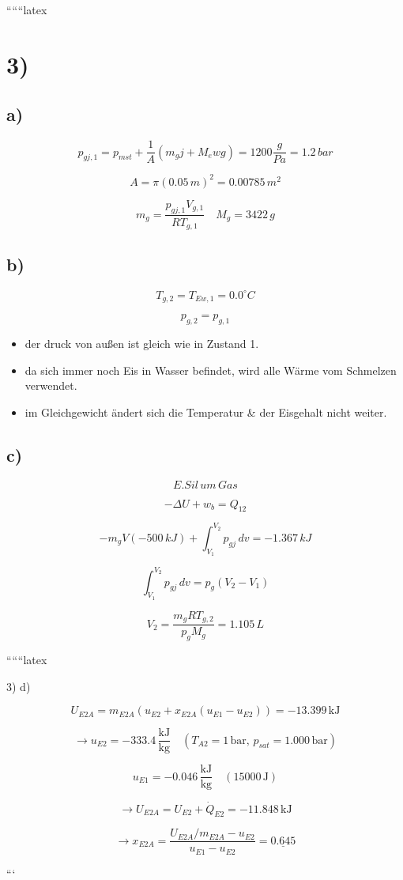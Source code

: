 
``````latex


\section*{3)}

\subsection*{a)}

\[
p_{gj,1} = p_{mst} + \frac{1}{A} (m_g j + M_e w g) = 1200 \frac{g}{Pa} = 1.2 \, bar
\]

\[
A = \pi (0.05 \, m)^2 = 0.00785 \, m^2
\]

\[
m_g = \frac{p_{gj,1} V_{g,1}}{R T_{g,1}} \quad M_g = 3422 \, g
\]

\subsection*{b)}

\[
T_{g,2} = T_{Ew,1} = 0.0^\circ C
\]

\[
p_{g,2} = p_{g,1}
\]

\begin{itemize}
    \item der druck von außen ist gleich wie in Zustand 1.
    \item da sich immer noch Eis in Wasser befindet, wird alle Wärme vom Schmelzen verwendet.
    \item im Gleichgewicht ändert sich die Temperatur \& der Eisgehalt nicht weiter.
\end{itemize}

\subsection*{c)}

\[
E.Sil \, um \, Gas
\]

\[
- \Delta U + w_b = Q_{12}
\]

\[
-m_g V (-500 \, kJ) + \int_{V_1}^{V_2} p_{gj} \, dv = -1.367 \, kJ
\]

\[
\int_{V_1}^{V_2} p_{gj} \, dv = p_g (V_2 - V_1)
\]

\[
V_2 = \frac{m_g R T_{g,2}}{p_g M_g} = 1.105 \, L
\]

``````latex


3) d)

\[
U_{E2A} = m_{E2A} (u_{E2} + x_{E2A} (u_{E1} - u_{E2})) = -13.399 \, \text{kJ}
\]

\[
\rightarrow u_{E2} = -333.4 \, \frac{\text{kJ}}{\text{kg}} \quad \left( T_{A2} = 1 \, \text{bar}, \, p_{sat} = 1.000 \, \text{bar} \right)
\]

\[
u_{E1} = -0.046 \, \frac{\text{kJ}}{\text{kg}} \quad \left( 15000 \, \text{J} \right)
\]

\[
\rightarrow U_{E2A} = U_{E2} + \dot{Q}_{E2} = -11.848 \, \text{kJ}
\]

\[
\rightarrow x_{E2A} = \frac{U_{E2A}/m_{E2A} - u_{E2}}{u_{E1} - u_{E2}} = \underline{0.645}
\]

```
